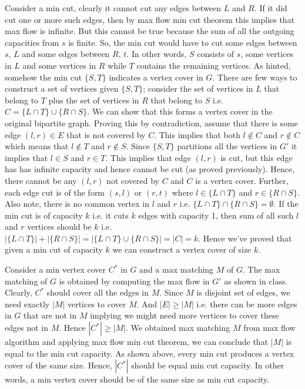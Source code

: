 \documentclass{article}
\begin{document}
    Consider a min cut, clearly it cannot cut any edges between $L$ and $R$. If it did cut one or more such edges, then by max flow min cut theorem this implies that max flow is infinite. But this cannot be true because the sum of all the outgoing capacities from $s$ is finite. So, the min cut would have to cut some edges between $s$, $L$ and some edges between $R$, $t$. In other words, $S$ consists of $s$, some vertices in $L$ and some vertices in $R$ while $T$ contains the remaining vertices. As hinted, somehow the min cut $\{S, T\}$ indicates a vertex cover in $G$. There are few ways to construct a set of vertices given $\{S, T\}$; consider the set of vertices in $L$ that belong to $T$ plus the set of vertices in $R$ that belong to $S$ i.e. $C = \{L \cap T\} \cup \{R \cap S\}$. We can show that this forms a vertex cover in the original bipartite graph. Proving this by contradiction, assume that there is some edge $(l, r) \in E$ that is not covered by $C$. This implies that both $l \notin C$ and $r \notin C$ which means that $l \notin T$ and $r \notin S$. Since $\{S, T\}$ partitions all the vertices in $G'$ it implies that $l \in S$ and $r \in T$. This implies that edge $(l, r)$ is cut, but this edge has has infinite capacity and hence cannot be cut (as proved previously). Hence, there cannot be any $(l, r)$ not covered by $C$ and $C$ is a vertex cover. Further, each edge cut is of the form $(s, l)$ or $(r, t)$ where $l \in \{L \cap T\}$ and $r \in \{R \cap S\}$. Also note, there is no common vertex in $l$ and $r$ i.e. $\{L \cap T\} \cap \{R \cap S\} = \emptyset$. If the min cut is of capacity $k$ i.e. it cuts $k$ edges with capacity 1, then sum of all such $l$ and $r$ vertices should be $k$ i.e. $|\{L \cap T\}| + |\{R \cap S\}| = |\{L \cap T\} \cup \{R \cap S\}| = |C| = k$. Hence we've proved that given a min cut of capacity $k$ we can construct a vertex cover of size $k$.

    Consider a min vertex cover $C^*$ in $G$ and a max matching $M$ of $G$. The max matching of $G$ is obtained by computing the max flow in $G'$ as shown in class. Clearly, $C^*$ should cover all the edges in $M$. Since $M$ is disjoint set of edges, we need exactly $|M|$ vertices to cover $M$. And $|E| \ge |M|$ i.e. there can be more edges in $G$ that are not in $M$ implying we might need more vertices to cover these edges not in $M$. Hence $|C^*| \ge |M|$. We obtained max matching $M$ from max flow algorithm and applying max flow min cut theorem, we can conclude that $|M|$ is equal to the min cut capacity. As shown above, every min cut produces a vertex cover of the same size. Hence, $|C^*|$ should be equal min cut capacity. In other words, a min vertex cover should be of the same size as min cut capacity.
\end{document}
